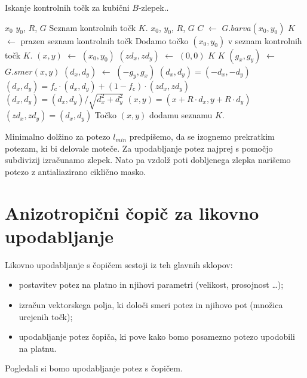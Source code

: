 %
\begin{algorithm}[htb]
  \caption{Iskanje kontrolnih točk za kubični $B$-zlepek..}
  \label{alg:splineStroke}
\begin{algorithmic}[1]
\Require $x_0$ $y_0$, $R$, $G$
\Ensure Seznam kontrolnih točk $K$.
 {$x_0$, $y_0$, $R$, $G$}
  \State $C$ $\gets$ $G.barva(x_0, y_0)$ %
  \State $K$ $\leftarrow$ prazen seznam kontrolnih točk
  \State Dodamo točko $(x_0, y_0)$ v seznam kontrolnih točk $K$.
  \State $(x, y)$ $\leftarrow$ $(x_0, y_0)$
  \State $(zd_x, zd_y)$ $\leftarrow$ $(0, 0)$
      \State \Return $K$
    \EndIf
      \State \Return $K$
    \EndIf
    \State $(g_x, g_y)$ $\gets$ $G.smer(x, y)$
    \State $(d_x, d_y)$ $\gets$ $(-g_y, g_x)$
      \State $(d_x, d_y) = (-d_x, -d_y)$
    \EndIf
    \State
    \State $(d_x, d_y) = f_c \cdot (d_x, d_y) + (1 - f_c) \cdot (zd_x, zd_y)$
    \State $(d_x, d_y) = (d_x, d_y) / \sqrt{d_x^2 + d_y^2}$
    \State $(x, y) = (x + R \cdot d_x, y + R \cdot d_y)$
    \State $(zd_x, zd_y) = (d_x, d_y)$
    \State Točko $(x, y)$ dodamu seznamu $K$.
  \EndFor
\EndFunction
\end{algorithmic}
\end{algorithm}
%
Minimalno dolžino za potezo $l_{min}$ predpišemo, da se izognemo prekratkim potezam, ki bi delovale moteče. Za upodabljanje potez najprej s pomočjo subdivizij izračunamo zlepek. Nato pa vzdolž poti dobljenega zlepka narišemo potezo z antialiazirano ciklično masko.
%
\section{Anizotropični čopič za likovno upodabljanje}
Likovno upodabljanje s čopičem sestoji iz teh glavnih sklopov:
%
\begin{itemize}
  \item postavitev potez na platno in njihovi parametri (velikost, prosojnost \ldots);
  \item izračun vektorskega polja, ki določi smeri potez in njihovo pot (množica urejenih točk);
  \item upodabljanje potez čopiča, ki pove kako bomo posamezno potezo upodobili na platnu.
\end{itemize}
%
Pogledali si bomo upodabljanje potez s čopičem.
%

